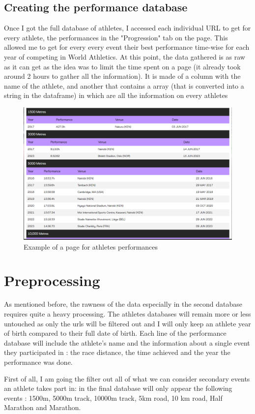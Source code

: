 \documentclass[10pt, a4paper]{article}
\begin{document}
\subsection*{Creating the performance database}

Once I got the full database of athletes, I accessed each individual URL to get for every athlete, the performances in the "Progression" tab on the page. This allowed me to get for every every event their best performance time-wise for each year of competing in World Athletics. At this point, the data gathered is as raw as it can get as the idea was to limit the time spent on a page (it already took around 2 hours to gather all the information). 
It is made of a column with the name of the athlete, and another that contains a array (that is converted into a string in the dataframe) in which are all the information on every athletes 

\begin{figure}
    \centering
    \includegraphics[width=0.5\linewidth]{Data/Figure_for_report/Performance scaping.png}
    \caption{Example of a page for athletes performances}
    \label{fig:perf-scrap}
\end{figure}

\newpage

\section{Preprocessing}

As mentioned before, the rawness of the data especially in the second database requires quite a heavy processing. The athletes databases will remain more or less untouched as only the urls will be filtered out and I will only keep an athlete year of birth compared to their full date of birth. Each line of the performance database will include the athlete's name and the information about a single event they participated in : the race distance, the time achieved and the year the performance was done.

First of all, I am going the filter out all of what we can consider secondary events an athlete takes part in: in the final database will only appear the following events  : 1500m, 5000m track, 10000m track, 5km road, 10 km road, Half Marathon and Marathon. 
\end{document}
